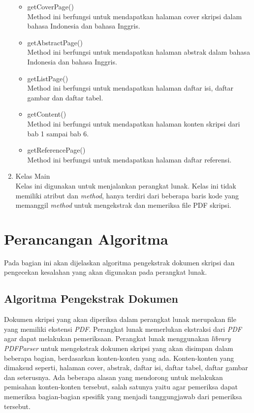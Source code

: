 \begin{enumerate}
\begin{itemize}
			\item getCoverPage() \\
			Method ini berfungsi untuk mendapatkan halaman cover skripsi dalam bahasa Indonesia dan bahasa Inggris.
			
			\item getAbstractPage() \\
			Method ini berfungsi untuk mendapatkan halaman abstrak dalam bahasa Indonesia dan bahasa Inggris.
			
			\item getListPage() \\
			Method ini berfungsi untuk mendapatkan halaman daftar isi, daftar gambar dan daftar tabel.
			
			\item getContent() \\
			Method ini berfungsi untuk mendapatkan halaman konten skripsi dari bab 1 sampai bab 6.
			
			\item getReferencePage() \\
			Method ini berfungsi untuk mendapatkan halaman daftar referensi.
			
		\end{itemize}
	
	\item Kelas Main \\
	Kelas ini digunakan untuk menjalankan perangkat lunak. Kelas ini tidak memiliki atribut dan \textit{method}, hanya terdiri dari beberapa baris kode yang memanggil \textit{method} untuk mengekstrak dan memeriksa file PDF skripsi. 

\end{enumerate} 

\section{Perancangan Algoritma}
Pada bagian ini akan dijelaskan algoritma pengekstrak dokumen skripsi dan pengecekan kesalahan yang akan digunakan pada perangkat lunak.
 
\subsection{Algoritma Pengekstrak Dokumen}
Dokumen skripsi yang akan diperiksa dalam perangkat lunak merupakan file yang memiliki ekstensi \textit{PDF}. Perangkat lunak memerlukan ekstraksi dari \textit{PDF} agar dapat melakukan pemeriksaan. Perangkat lunak menggunakan \textit{library PDFParser} untuk mengekstrak dokumen skripsi yang akan disimpan dalam beberapa bagian, berdasarkan konten-konten yang ada. Konten-konten yang dimaksud seperti, halaman cover, abstrak, daftar isi, daftar tabel, daftar gambar dan seterusnya. Ada beberapa alasan yang mendorong untuk melakukan pemisahan konten-konten tersebut, salah satunya yaitu agar pemeriksa dapat memeriksa bagian-bagian spesifik yang menjadi tanggungjawab dari pemeriksa tersebut.

